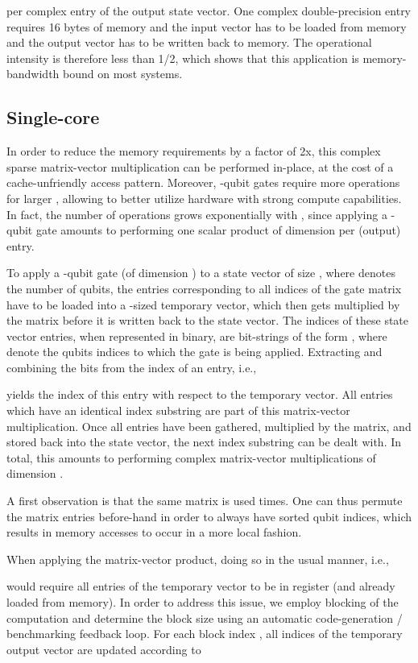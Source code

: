 \documentclass[sigconf]{acmart}
\begin{document}
per complex entry of the output state vector. One complex double-precision entry requires 16 bytes of memory and the input vector has to be loaded from memory and the output vector has to be written back to memory. The operational intensity is therefore less than 1/2, which shows that this application is memory-bandwidth bound on most systems.

\subsection{Single-core}\label{sec:singlecore}
In order to reduce the memory requirements by a factor of 2x, this complex sparse matrix-vector multiplication can be performed in-place, at the cost of a cache-unfriendly access pattern. Moreover, -qubit gates require more operations for larger , allowing to better utilize hardware with strong compute capabilities. In fact, the number of operations grows exponentially with , since applying a -qubit gate amounts to performing one scalar product of dimension  per (output) entry.

To apply a -qubit gate (of dimension ) to a state vector of size , where  denotes the number of qubits, the entries corresponding to all  indices of the gate matrix have to be loaded into a -sized temporary vector, which then gets multiplied by the matrix before it is written back to the state vector. The indices of these state vector entries, when represented in binary, are bit-strings of the form , where  denote the  qubits indices to which the gate is being applied. Extracting and combining the bits  from the index of an entry, i.e.,

yields the index of this entry with respect to the temporary vector. All  entries which have an identical  index substring are part of this matrix-vector multiplication. Once all entries have been gathered, multiplied by the matrix, and stored back into the state vector, the next  index substring can be dealt with. In total, this amounts to performing  complex matrix-vector multiplications of dimension .

A first observation is that the same matrix is used  times. One can thus permute the matrix entries before-hand in order to always have sorted qubit indices, which results in memory accesses to occur in a more local fashion.

When applying the matrix-vector product, doing so in the usual manner, i.e.,

would require all entries of the temporary vector  to be in register (and already loaded from memory). In order to address this issue, we employ blocking of the computation and determine the block size using an automatic code-generation / benchmarking feedback loop. For each block index , all indices  of the temporary output vector  are updated according to
\end{document}
